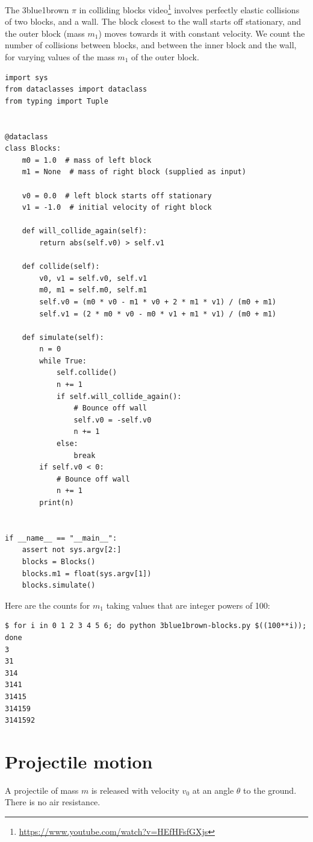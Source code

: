\newpage
The 3blue1brown $\pi$ in colliding blocks
video\footnote{\url{https://www.youtube.com/watch?v=HEfHFsfGXjs}} involves perfectly elastic
collisions of two blocks, and a wall. The block closest to the wall starts off stationary, and the
outer block (mass $m_1$) moves towards it with constant velocity. We count the number of collisions
between blocks, and between the inner block and the wall, for varying values of the mass $m_1$ of
the outer block.

\begin{verbatim}
import sys
from dataclasses import dataclass
from typing import Tuple


@dataclass
class Blocks:
    m0 = 1.0  # mass of left block
    m1 = None  # mass of right block (supplied as input)

    v0 = 0.0  # left block starts off stationary
    v1 = -1.0  # initial velocity of right block

    def will_collide_again(self):
        return abs(self.v0) > self.v1

    def collide(self):
        v0, v1 = self.v0, self.v1
        m0, m1 = self.m0, self.m1
        self.v0 = (m0 * v0 - m1 * v0 + 2 * m1 * v1) / (m0 + m1)
        self.v1 = (2 * m0 * v0 - m0 * v1 + m1 * v1) / (m0 + m1)

    def simulate(self):
        n = 0
        while True:
            self.collide()
            n += 1
            if self.will_collide_again():
                # Bounce off wall
                self.v0 = -self.v0
                n += 1
            else:
                break
        if self.v0 < 0:
            # Bounce off wall
            n += 1
        print(n)


if __name__ == "__main__":
    assert not sys.argv[2:]
    blocks = Blocks()
    blocks.m1 = float(sys.argv[1])
    blocks.simulate()
\end{verbatim}

Here are the counts for $m_1$ taking values that are integer powers of 100:

\begin{verbatim}
$ for i in 0 1 2 3 4 5 6; do python 3blue1brown-blocks.py $((100**i)); done
3
31
314
3141
31415
314159
3141592
\end{verbatim}

\section{Projectile motion}

A projectile of mass $m$ is released with velocity $v_0$ at an angle $\theta$ to the ground. There
is no air resistance.

